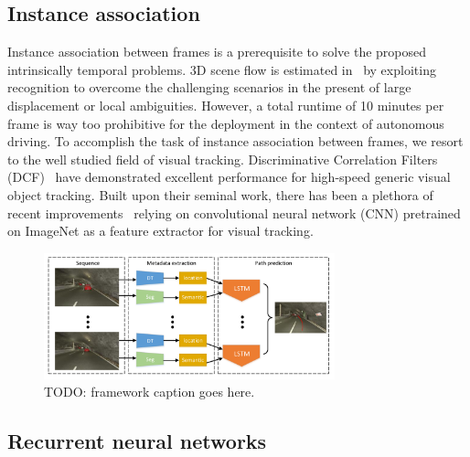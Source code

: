 \documentclass[10pt,twocolumn,letterpaper]{article}
\begin{document}
\subsection{Instance association}
Instance association between frames is a prerequisite to solve the proposed intrinsically temporal problems.  3D scene flow is estimated in~\cite{behl2017bounding} by exploiting recognition to overcome the challenging scenarios in the present of large displacement or local ambiguities. 
However, a total runtime of 10 minutes per frame is way too prohibitive for the deployment in the context of autonomous driving.
To accomplish the task of instance association between frames, we resort to the well studied field of visual tracking. 
Discriminative Correlation Filters (DCF)~\cite{henriques2015high} have demonstrated excellent performance for high-speed generic visual object tracking.
Built upon their seminal work, there has been a plethora of recent improvements~\cite{wang2016stct, wang2015visual, hong2015online, ma2015hierarchical,danelljan2016beyond,held2016learning, wu2017kernalised,danelljan2017eco} relying on convolutional neural network (CNN) pretrained on ImageNet as a feature extractor for visual tracking.

\begin{figure}[t]
        \centering
        \includegraphics[width=0.75\textwidth]{figures/framework.pdf}
        \caption{ {\small TODO: framework caption goes here.}}
        \label{fig:framework}
\end{figure}


\subsection{Recurrent neural networks}
\end{document}
